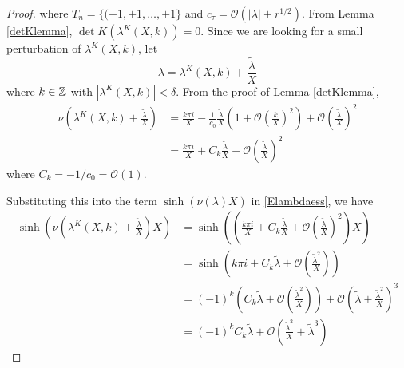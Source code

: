 \documentclass[thesis.tex]{subfiles}
\begin{document}
\begin{lemma}
\begin{proof}
where $T_n = \{ (\pm 1, \pm 1, \dots, \pm 1 \}$ and $c_\tau = \mathcal{O}(|\lambda| + r^{1/2})$. From Lemma \ref{detKlemma}, $\det K(\lambda^K(X,k)) = 0$. Since we are looking for a small perturbation of $\lambda^K(X,k)$, let
\begin{equation}\label{tildelambdadef}
\lambda = \lambda^K(X,k) + \frac{\tilde{\lambda}}{X}
\end{equation}
where $k \in {\mathbb Z}$ with $|\lambda^K(X,k)| < \delta$. From the proof of Lemma \ref{detKlemma}, 
\begin{align*}
\nu\left( \lambda^K(X, k) + \frac{\tilde{\lambda}}{X} \right) 
&= \frac{k \pi i}{X} -\frac{1}{c_0}\frac{\tilde{\lambda}}{X} \left( 1 + \mathcal{O} \left(\frac{k}{X}\right)^2 \right) + \mathcal{O}\left( \frac{\tilde{\lambda}}{X}\right)^2 \\
&= \frac{k \pi i}{X} + C_k \frac{\tilde{\lambda}}{X} + \mathcal{O}\left( \frac{\tilde{\lambda}}{X}\right)^2 
\end{align*}
where $C_k = -1/c_0 = \mathcal{O}(1)$. 

Substituting this into the term $\sinh(\nu(\lambda)X)$ in \eqref{Elambdaess}, we have
\begin{align*}
\sinh\left(\nu\left(\lambda^K(X, k) + \frac{\tilde{\lambda}}{X}\right)X\right)
&= \sinh\left(\left(\frac{k \pi i}{X} + C_k \frac{\tilde{\lambda}}{X} + \mathcal{O}\left( \frac{\tilde{\lambda}}{X}\right)^2 \right) X\right) \\
&= \sinh\left( k \pi i + C_k \tilde{\lambda} + \mathcal{O}\left( \frac{\tilde{\lambda}^2}{X}\right) \right) \\
&= (-1)^k \left( C_k \tilde{\lambda} + \mathcal{O}\left( \frac{\tilde{\lambda}^2}{X}\right) \right) + \mathcal{O}\left( \tilde{\lambda} + \frac{\tilde{\lambda}^2}{X} \right)^3 \\
&= (-1)^k C_k \tilde{\lambda} + \mathcal{O}\left( \frac{\tilde{\lambda}^2}{X} + \tilde{\lambda}^3 \right)
\end{align*}


\end{proof}
\end{lemma}
\end{document}
